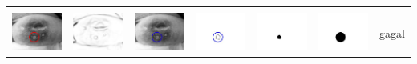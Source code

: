 \begin{table}[H]
\begin{tabular}{|m{0.7in}|m{0.7in}|m{0.7in}|m{0.7in}|m{0.7in}|m{0.7in}|m{0.7in}|}
		&  &  & & & &  \\
		\includegraphics[width=0.7in]{dataset/dataset_3/luka_kuning/ready/17_integer_init.jpg}&
		\includegraphics[width=0.7in]{dataset/dataset_3/luka_kuning/ready/17_integer_ext.jpg}&
		\includegraphics[width=0.7in]{dataset/dataset_3/luka_kuning/ready/17_integer_result.jpg}&
		\includegraphics[width=0.7in]{dataset/dataset_3/luka_kuning/ready/17_gt_r_integer.jpg}&
		\includegraphics[width=0.7in]{dataset/dataset_3/luka_kuning/ready/17_r.jpg}&
		\includegraphics[width=0.7in]{dataset/dataset_3/luka_kuning/ready/17_integer_r.jpg}&
		gagal\\
		\hline
		

\end{tabular}
\end{table}
